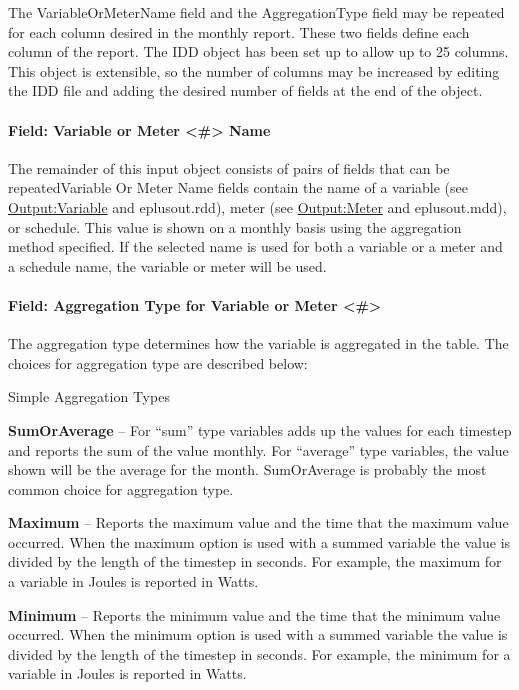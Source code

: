 The VariableOrMeterName field and the AggregationType field may be repeated for each column desired in the monthly report. These two fields define each column of the report. The IDD object has been set up to allow up to 25 columns. This object is extensible, so the number of columns may be increased by editing the IDD file and adding the desired number of fields at the end of the object.

\paragraph{Field: Variable or Meter \textless{}\#\textgreater{} Name}\label{field-variable-or-meter-name-000}

The remainder of this input object consists of pairs of fields that can be repeatedVariable Or Meter Name fields contain the name of a variable (see \hyperref[outputvariable]{Output:Variable} and eplusout.rdd), meter (see \hyperref[outputmeter-and-outputmetermeterfileonly]{Output:Meter} and eplusout.mdd), or schedule. This value is shown on a monthly basis using the aggregation method specified. If the selected name is used for both a variable or a meter and a schedule name, the variable or meter will be used.

\paragraph{Field: Aggregation Type for Variable or Meter \textless{}\#\textgreater{}}\label{field-aggregation-type-for-variable-or-meter-000}

The aggregation type determines how the variable is aggregated in the table. The choices for aggregation type are described below:

Simple Aggregation Types

\textbf{SumOrAverage} -- For ``sum'' type variables adds up the values for each timestep and reports the sum of the value monthly. For ``average'' type variables, the value shown will be the average for the month. SumOrAverage is probably the most common choice for aggregation type.

\textbf{Maximum} -- Reports the maximum value and the time that the maximum value occurred. When the maximum option is used with a summed variable the value is divided by the length of the timestep in seconds. For example, the maximum for a variable in Joules is reported in Watts.

\textbf{Minimum} -- Reports the minimum value and the time that the minimum value occurred. When the minimum option is used with a summed variable the value is divided by the length of the timestep in seconds. For example, the minimum for a variable in Joules is reported in Watts.

